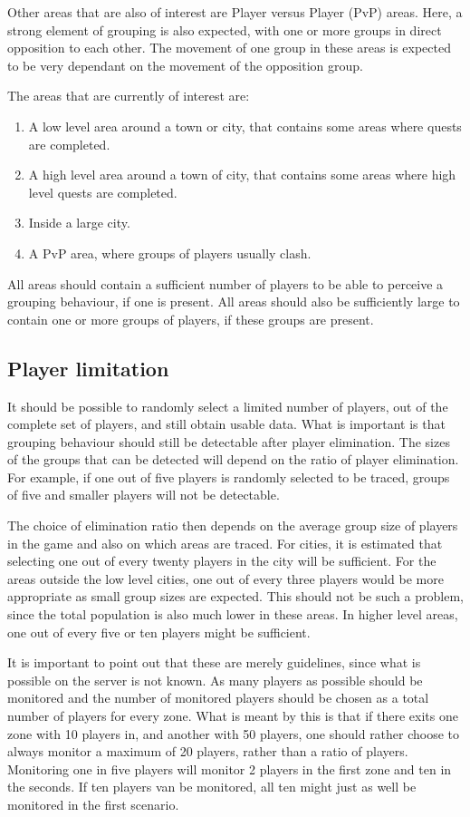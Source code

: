 \documentclass[journal,oneside,a4paper,onecolumn]{IEEEtran}
\begin{document}
Other areas that are also of interest are Player versus Player (PvP) areas. Here, a strong element of grouping is also expected, with one or more
groups in direct opposition to each other. The movement of one group in these areas is expected to be very dependant on the movement of the
opposition group.

The areas that are currently of interest are:
\begin{enumerate}
\item A low level area around a town or city, that contains some areas where quests are completed.
\item A high level area around a town of city, that contains some areas where high level quests are completed.
\item Inside a large city.
\item A PvP area, where groups of players usually clash.
\end{enumerate}
%
All areas should contain a sufficient number of players to be able to perceive a grouping behaviour, if one is present. All areas should also be
sufficiently large to contain one or more groups of players, if these groups are present.

\subsection{Player limitation}

It should be possible to randomly select a limited number of players, out of the complete set of players, and still obtain usable data. What is
important is that grouping behaviour should still be detectable after player elimination. The sizes of the groups that can be detected will depend on
the ratio of player elimination. For example, if one out of five players is randomly selected to be traced, groups of five and smaller players will
not be detectable.

The choice of elimination ratio then depends on the average group size of players in the game and also on which areas are traced. For cities, it is
estimated that selecting one out of every twenty players in the city will be sufficient. For the areas outside the low level cities, one out of every
three players would be more appropriate as small group sizes are expected. This should not be such a problem, since the total population is also much
lower in these areas. In higher level areas, one out of every five or ten players might be sufficient.

It is important to point out that these are merely guidelines, since what is possible on the server is not known. As many players as possible should
be monitored and the number of monitored players should be chosen as a total number of players for every zone. What is meant by this is that if there
exits one zone with 10 players in, and another with 50 players, one should rather choose to always monitor a maximum of 20 players, rather than a
ratio of players. Monitoring one in five players will monitor 2 players in the first zone and ten in the seconds. If ten players van be monitored,
all ten might just as well be monitored in the first scenario.
\end{document}
